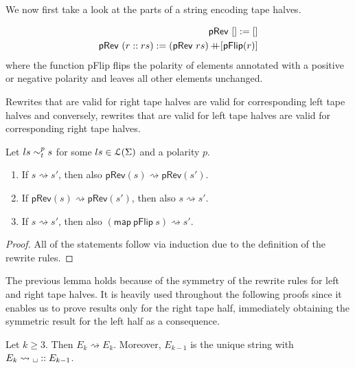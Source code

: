 \documentclass[a4paper,UKenglish,cleveref, autoref]{lipics-v2019}
\newcommand{\strent}{\rightsquigarrow}
\begin{document}
We now first take a look at the parts of a string encoding tape halves.

\begin{definition}
  \begin{align*}
    \textsf{pRev}~[] := [] \\
    \textsf{pRev}~(r::rs) :=  (\textsf{pRev}~rs) \mathop{{+}\!\!\!{+}} [\textsf{pFlip}(r)]
  \end{align*}
  where the function \textsf{pFlip} flips the polarity of elements annotated with a positive or negative polarity and leaves all other elements unchanged.
\end{definition}

\newcommand*{\pRev}[1]{\textsf{pRev}(#1)}

\begin{lemma}\label{lem:taperev}
  Rewrites that are valid for right tape halves are valid for corresponding left tape halves and conversely, rewrites that are valid for left tape halves are valid for corresponding right tape halves.

  Let $ls \sim_t^{p} s$ for some $ls \in \mathcal{L} (\Sigma)$ and a polarity $p$.
  \begin{enumerate}
    \item If $s \strent{} s'$, then also $\pRev{s} \strent{} \pRev{s'}$. 
    \item If $\pRev{s} \strent{} \pRev{s'}$, then also $s \strent{} s'$. 
    \item If $s \strent{} s'$, then also $(\textsf{map}~\textsf{pFlip}~s) \strent{} s'$. 
  \end{enumerate}
\end{lemma}
\begin{proof}
  All of the statements follow via induction due to the definition of the rewrite rules.
\end{proof}

The previous lemma holds because of the symmetry of the rewrite rules for left and right tape halves. It is heavily used throughout the following proofs since it enables us to prove results only for the right tape half, immediately obtaining the symmetric result for the left half as a consequence.

\begin{lemma}\label{lem:blankrew}
  Let $k \ge 3$. Then $E_k \strent{} E_k$. Moreover, $E_{k-1}$ is the unique string with $E_k \strent{} \blank :: E_{k-1}$. 
\end{lemma}
\end{document}
